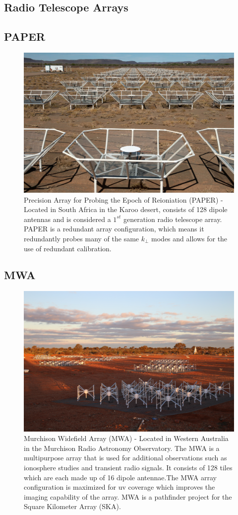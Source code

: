 \documentclass[a0,landscape]{a0poster}
\begin{document}
\begin{multicols}{4}
\section*{Radio Telescope Arrays}
\subsection*{PAPER}
\begin{figure}[H]
\centering
\label{fig:PAPER}
\includegraphics[width=0.6\linewidth]{figures/paper}
\caption{Precision Array for Probing the Epoch of Reioniation (PAPER) - Located in South Africa in the Karoo desert, consists of 128 dipole antennas and is considered a $1^{st}$ generation radio telescope array. PAPER is a redundant array configuration, which means it redundantly probes many of the same $k_\perp$ modes and allows for the use of redundant calibration.}
\end{figure}

\subsection*{MWA}
\begin{figure}[H]
\centering
\label{fig:MWA}
\includegraphics[width=0.6\linewidth]{figures/phaseII_tiles.jpg}
\caption{Murchison Widefield Array (MWA) - Located in Western Australia in the Murchison Radio Astronomy Observatory. The MWA is a multipurpose array that is used for additional observations such as ionosphere studies and transient radio signals. It consists of 128 tiles which are each made up of 16 dipole antennae.The MWA array configuration is maximized for uv coverage which improves the imaging capability of the array. MWA is a pathfinder project for the Square Kilometer Array (SKA).}
\end{figure}


\end{multicols}
\end{document}
